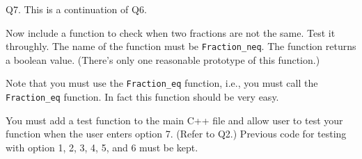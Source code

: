 Q7.
This is a continuation of Q6.

Now include a function to check when two fractions are not the same.
Test it throughly.
The name of the function must be \verb!Fraction_neq!.
The function returns a boolean value.
(There's only one reasonable prototype of this function.)

Note that you must use the \verb!Fraction_eq! function, i.e.,
you must call the \verb!Fraction_eq! function.
In fact this function should be very easy.

You must add a test function to the main C++ file and allow user to test
your function when the user enters option 7. (Refer to Q2.)
Previous code for testing with option 1, 2, 3, 4, 5, and 6 must be kept.

